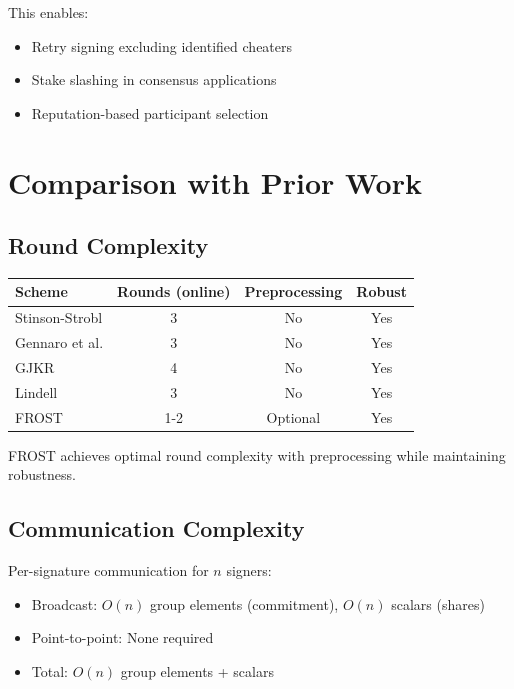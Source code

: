 \documentclass[11pt,a4paper]{article}
\begin{document}
This enables:
\begin{itemize}
    \item Retry signing excluding identified cheaters
    \item Stake slashing in consensus applications
    \item Reputation-based participant selection
\end{itemize}

\section{Comparison with Prior Work}

\subsection{Round Complexity}

\begin{center}
\begin{tabular}{|l|c|c|c|}
\hline
\textbf{Scheme} & \textbf{Rounds (online)} & \textbf{Preprocessing} & \textbf{Robust} \\
\hline
Stinson-Strobl \cite{stinson2001} & 3 & No & Yes \\
Gennaro et al. \cite{gennaro2003} & 3 & No & Yes \\
GJKR \cite{gennaro2007} & 4 & No & Yes \\
Lindell \cite{lindell2022} & 3 & No & Yes \\
FROST & 1-2 & Optional & Yes \\
\hline
\end{tabular}
\end{center}

FROST achieves optimal round complexity with preprocessing while maintaining robustness.

\subsection{Communication Complexity}

Per-signature communication for $n$ signers:
\begin{itemize}
    \item Broadcast: $O(n)$ group elements (commitment), $O(n)$ scalars (shares)
    \item Point-to-point: None required
    \item Total: $O(n)$ group elements + scalars
\end{itemize}
\end{document}
